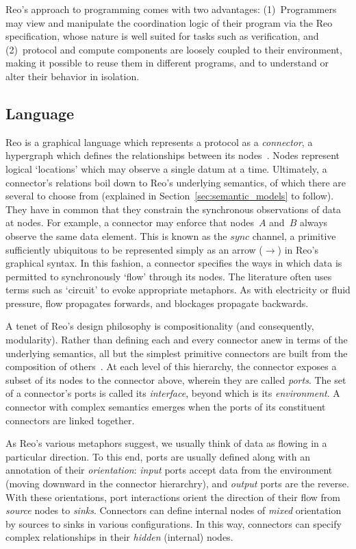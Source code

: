 Reo's approach to programming comes with two advantages: (1)~Programmers may view and manipulate the coordination logic of their program via the Reo specification, whose nature is well suited for tasks such as verification, and (2)~protocol and compute components are loosely coupled to their environment, making it possible to reuse them in different programs, and to understand or alter their behavior in isolation.


\subsection{Language}
\label{sec:reo_lang}
Reo is a graphical language which represents a protocol as a \textit{connector}, a hypergraph which defines the relationships between its nodes~\cite{arbab2011puff}. Nodes represent logical `locations' which may observe a single datum at a time. Ultimately, a connector's relations boil down to Reo's underlying semantics, of which there are several to choose from (explained in Section~\ref{sec:semantic_models} to follow). They have in common that they constrain the synchronous observations of data at nodes. For example, a connector may enforce that nodes~$A$ and~$B$ always observe the same data element. This is known as the $sync$ channel, a primitive sufficiently ubiquitous to be represented simply as an arrow ($\longrightarrow$) in Reo's graphical syntax. In this fashion, a connector specifies the ways in which data is permitted to synchronously `flow' through its 	nodes. The literature often uses terms such as `circuit'  to evoke appropriate metaphors. As with electricity or fluid pressure, flow propagates forwards, and blockages propagate backwards.

A tenet of Reo's design philosophy is compositionality (and consequently, modularity). Rather than defining each and every connector anew in terms of the underlying semantics, all but the simplest primitive connectors are built from the composition of others~\cite{arbab2011puff}. At each level of this hierarchy, the connector exposes a subset of its nodes to the connector above, wherein they are called \textit{ports}. The set of a connector's ports is called its \textit{interface}, beyond which is its \textit{environment}. A connector with complex semantics emerges when the ports of its constituent connectors are linked together. 

As Reo's various metaphors suggest, we usually think of data as flowing in a particular direction. To this end, ports are usually defined along with an annotation of their \textit{orientation}: \textit{input} ports accept data from the environment (moving downward in the connector hierarchry), and \textit{output} ports are the reverse. With these orientations, port interactions orient the direction of their flow from \textit{source} nodes to \textit{sinks}. Connectors can define internal nodes of \textit{mixed} orientation by sources to sinks in various configurations. In this way, connectors can specify complex relationships in their \textit{hidden} (internal) nodes. 

